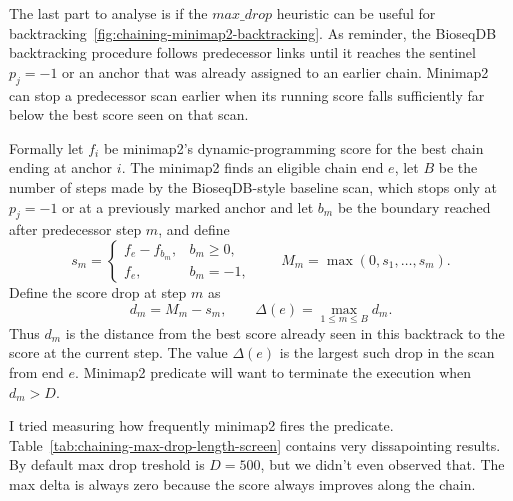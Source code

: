 The last part to analyse is if the $max\_drop$ heuristic can be useful for backtracking~\ref{fig:chaining-minimap2-backtracking}.
As reminder, the BioseqDB backtracking procedure follows predecessor links until it reaches
the sentinel \(p_j=-1\) or an anchor that was already assigned to an earlier
chain.  Minimap2 can stop a predecessor scan earlier when its running score
falls sufficiently far below the best score seen on that scan.

Formally let \(f_i\) be minimap2's dynamic-programming score for the best chain ending
at anchor \(i\). The minimap2 finds an eligible chain end \(e\), let \(B\) be the number of
steps made by the BioseqDB-style baseline scan, which stops only at
\(p_j=-1\) or at a previously marked anchor and let \(b_m\) be the boundary
reached after predecessor step \(m\), and define
\[
  s_m=
  \begin{cases}
    f_e-f_{b_m}, & b_m\geq0,\\
    f_e, & b_m=-1,
  \end{cases}
  \qquad
  M_m=\max(0,s_1,\ldots,s_m).
\]
Define the score drop at step \(m\) as
\[
  d_m=M_m-s_m,
  \qquad
  \Delta(e)=\max_{1\leq m\leq B}d_m.
\]
Thus \(d_m\) is the distance from the best score already seen in this
backtrack to the score at the current step.  The value \(\Delta(e)\) is the
largest such drop in the scan from end \(e\). Minimap2 predicate will want to terminate the execution when \(d_m>D\).

I tried measuring how frequently minimap2 fires the predicate. Table~\ref{tab:chaining-max-drop-length-screen} contains very dissapointing results. By default max drop treshold is $D=500$, but we didn't even observed that.
The max delta is always zero because the score always improves along the chain.

